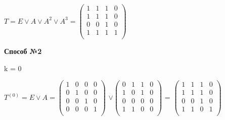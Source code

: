 \documentclass{article}
\begin{document}
\vspace{5mm}
\par

\hspace{8mm}
$T = E \vee A \vee A^2 \vee A^3 = 
\begin{pmatrix}
	1 & 1 & 1 & 0\\
	1 & 1 & 1 & 0\\
	0 & 0 & 1 & 0\\
	1 & 1 & 1 & 1\\
\end{pmatrix}$

\par 
\hspace{6mm}\textbf{Способ №2}
\begin{center}
	k = 0
\end{center}
\vspace{5mm}
\par
\hspace{8mm}
$T^{(0)} = E \vee A = 
\begin{pmatrix}
	1 & 0 & 0 & 0\\
	0 & 1 & 0 & 0\\
	0 & 0 & 1 & 0\\
	0 & 0 & 0 & 1\\
\end{pmatrix}$
$\vee\begin{pmatrix}
	0 & 1 & 1 & 0\\
	1 & 0 & 1 & 0\\
	0 & 0 & 0 & 0\\
	1 & 1 & 0 & 0\\
\end{pmatrix}$ =
$\begin{pmatrix}
	1 & 1 & 1 & 0\\
	1 & 1 & 1 & 0\\
	0 & 0 & 1 & 0\\
	1 & 1 & 0 & 1\\
\end{pmatrix}$
\end{document}
